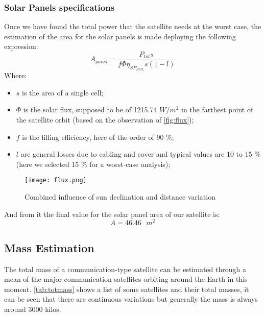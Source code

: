 \subsubsection{Solar Panels specifications}
	Once we have found the total power that the satellite needs at the worst case, the estimation of the area for the solar panels is made deploying the following expression:
\begin{equation}
A_{panel} = \frac{P_{tot} s}{f \Phi \eta_{SP_{EOL}} s (1 - l)}
\end{equation}
Where:
\begin{itemize}
\item $s$ is the area of a single cell;
\item $\Phi$ is the solar flux, supposed to be of 1215.74 $W/m^2$ in the farthest point of the satellite orbit (based on the observation of \autoref{fig:flux});
\item $f$ is the filling efficiency, here of the order of 90 \%;
\item $l$ are general losses due to cabling and cover and typical values are 10 to 15 \% (here we selected 15 \% for a worst-case analysis);
\end{itemize}
\begin{figure}[h]
\centering
\texttt{[image: flux.png]}
\caption{Combined influence of sun declination and distance variation}
\label{fig:flux}
\end{figure}
And from it the final value for the solar panel area of our satellite is:
\begin{equation}
A = 46.46 \text{ $m^2$}
\end{equation}
\subsection{Mass Estimation}
	The total mass of a communication-type satellite can be estimated through a mean of the major communication satellites orbiting around the Earth in this moment. \autoref{tab:totmass} shows a list of some satellites and their total masses, it can be seen that there are continuous variations but generally the mass is always around 3000 kilos.


